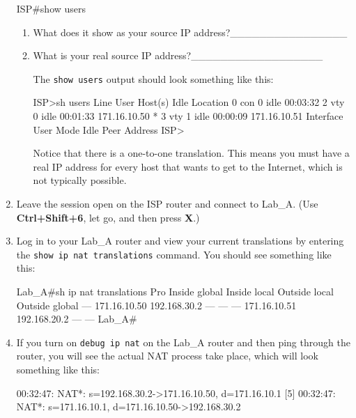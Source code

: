\begin{enumerate}
\begin{cli}
ISP#show users
\end{cli}

  \begin{enumerate}
  \item
    What does it show as your source IP
    address?\_\_\_\_\_\_\_\_\_\_\_\_\_\_\_\_
  \item
    What is your real source IP
    address?\_\_\_\_\_\_\_\_\_\_\_\_\_\_\_\_\_\_

    The \texttt{show\ users} output should look something like this:

\begin{cli}
ISP>sh users
    Line       User       Host(s)              Idle       Location
   0 con 0                idle                 00:03:32
   2 vty 0                idle                 00:01:33 171.16.10.50
*  3 vty 1                idle                 00:00:09 171.16.10.51
  Interface  User      Mode                     Idle Peer Address
ISP>
\end{cli}

   \begin{note}
    Notice that there is a one-to-one translation.
    This means you must have a real IP address for every host that wants to get to the Internet, which is not typically possible.
   \end{note}
  \end{enumerate}
\item
  Leave the session open on the ISP router and connect to Lab\_A. (Use
  \textbf{Ctrl+Shift+6}, let go, and then press \textbf{X}.)
\item
  Log in to your Lab\_A router and view your current translations by
  entering the \texttt{show\ ip\ nat\ translations} command. You should
  see something like this:

\begin{cli}
Lab_A#sh ip nat translations
Pro Inside global      Inside local       Outside local      Outside global
--- 171.16.10.50       192.168.30.2       ---                ---
--- 171.16.10.51       192.168.20.2       ---                ---
Lab_A#
\end{cli}
\item
  If you turn on \texttt{debug\ ip\ nat} on the Lab\_A router and then
  ping through the router, you will see the actual NAT process take
  place, which will look something like this:

\begin{cli}
00:32:47: NAT*: s=192.168.30.2->171.16.10.50, d=171.16.10.1 [5]
00:32:47: NAT*: s=171.16.10.1, d=171.16.10.50->192.168.30.2
\end{cli}
\end{enumerate}




